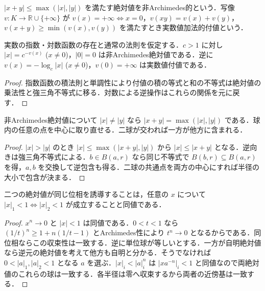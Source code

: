 \begin{defn}[非Archimedes絶対値と付値]
$|x+y|\leq\max(|x|,|y|)$ を満たす絶対値を非Archimedes的という．写像 $v:K\to\mathbb R\cup\{+\infty\}$ が $v(x)=+\infty\Leftrightarrow x=0$，$v(xy)=v(x)+v(y)$，$v(x+y)\geq\min(v(x),v(y))$ を満たすとき実数値加法的付値という．
\end{defn}
\begin{prop}
実数の指数・対数函数の存在と通常の法則を仮定する．$c>1$ に対し $|x|=c^{-v(x)}$ ($x\ne0$)，$|0|=0$ は非Archimedes絶対値である．逆に $v(x)=-\log_c|x|$ ($x\ne0$)，$v(0)=+\infty$ は実数値付値である．
\end{prop}
\begin{proof}
指数函数の積法則と単調性により付値の積の等式と和の不等式は絶対値の乗法性と強三角不等式に移る．対数による逆操作はこれらの関係を元に戻す．
\end{proof}
\begin{prop}[非Archimedes球の性質]
非Archimedes絶対値について $|x|\ne|y|$ なら $|x+y|=\max(|x|,|y|)$ である．球内の任意の点を中心に取り直せる．二球が交われば一方が他方に含まれる．
\end{prop}
\begin{proof}
$|x|>|y|$ のとき $|x|\leq\max(|x+y|,|y|)$ から $|x|\leq|x+y|$ となる．逆向きは強三角不等式による．$b\in B(a,r)$ なら同じ不等式で $B(b,r)\subseteq B(a,r)$ を得，$a,b$ を交換して逆包含も得る．二球の共通点を両方の中心にすれば半径の大小で包含が決まる．
\end{proof}
\begin{prop}[絶対値の同値性]
二つの絶対値が同じ位相を誘導することは，任意の $x$ について $|x|_1<1\Leftrightarrow |x|_2<1$ が成立することと同値である．
\end{prop}
\begin{proof}
$x^n\to0$ と $|x|<1$ は同値である．$0<t<1$ なら $(1/t)^n\geq1+n(1/t-1)$ とArchimedes性により $t^n\to0$ となるからである．同位相ならこの収束性は一致する．逆に単位球が等しいとする．一方が自明絶対値なら逆元の絶対値を考えて他方も自明と分かる．そうでなければ $0<|a|_1,|a|_2<1$ となる $a$ を選ぶ．$|x|_i<|a|_i^n$ は $|xa^{-n}|_i<1$ と同値なので両絶対値のこれらの球は一致する．各半径は零へ収束するから両者の近傍基は一致する．
\end{proof}
